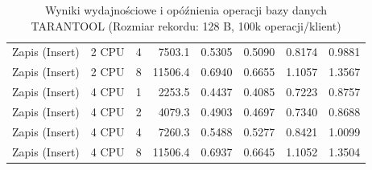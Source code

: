 \begin{table}[ht]
{\begin{tabular}{llcrrrrr}
Zapis (Insert) & 2 CPU & 4 & 7503.1 & 0.5305 & 0.5090 & 0.8174 & 0.9881 \\
Zapis (Insert) & 2 CPU & 8 & 11506.4 & 0.6940 & 0.6655 & 1.1057 & 1.3567 \\
Zapis (Insert) & 4 CPU & 1 & 2253.5 & 0.4437 & 0.4085 & 0.7223 & 0.8757 \\
Zapis (Insert) & 4 CPU & 2 & 4079.3 & 0.4903 & 0.4697 & 0.7340 & 0.8688 \\
Zapis (Insert) & 4 CPU & 4 & 7260.3 & 0.5488 & 0.5277 & 0.8421 & 1.0099 \\
Zapis (Insert) & 4 CPU & 8 & 11506.4 & 0.6937 & 0.6645 & 1.1052 & 1.3504 \\
\bottomrule
\end{tabular}%
}
\caption{Wyniki wydajnościowe i opóźnienia operacji bazy danych TARANTOOL (Rozmiar rekordu: 128 B, 100k operacji/klient)}
\label{tab:latency_tarantool_small_100000}
\end{table}
